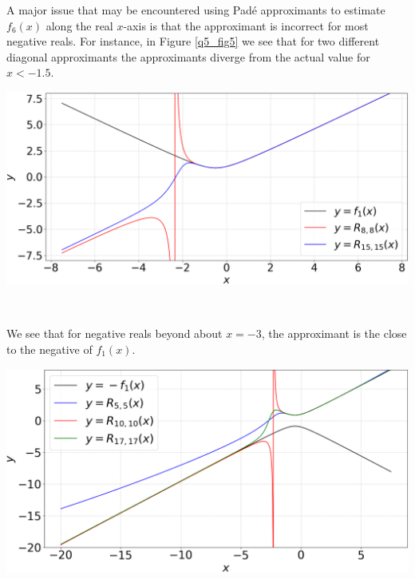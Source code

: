 \documentclass[12pt, a4paper]{article}
\begin{document}
\vspace{0.5cm}
A major issue that may be encountered using Pad\'e approximants to estimate $f_{6}(x)$ along the
real $x$-axis is that the approximant is incorrect for most negative reals. For instance, in
Figure \ref{q5_fig5} we see that for two different diagonal approximants the approximants diverge
from the actual value for $x<-1.5$.\\

\begin{minipage}{\textwidth}
	\centering
	\includegraphics[width=\linewidth]{q5_fig5}

	\vspace{-0.2cm}

	\label{q5_fig5}
\end{minipage}
\\

\vspace{0.3cm}

We see that for negative reals beyond about $x=-3$, the approximant is the close to the 
negative of $f_{1}(x)$.

\vspace{0.3cm}

\begin{minipage}{\textwidth}
	\centering
	\includegraphics[width=\linewidth]{q5_fig6}

	\vspace{-0.2cm}

	\label{q5_fig6}
\end{minipage}
\vspace{0.3cm}
\end{document}
